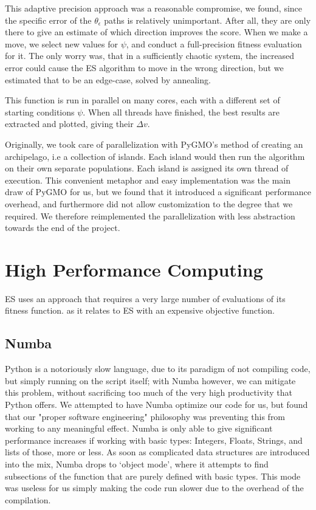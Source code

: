 This adaptive precision approach was a reasonable compromise, we found, since the specific error of the \(\theta_\epsilon\) paths is relatively unimportant. After all, they are only there to give an estimate of which direction improves the score. When we make a move, we select new values for \(\psi\), and conduct a full-precision fitness evaluation for it. The only worry was, that in a sufficiently chaotic system, the increased error could cause the ES algorithm to move in the wrong direction, but we estimated that to be an edge-case, solved by annealing.

This function is run in parallel on many cores, each with a different set of starting conditions \(\psi\). When all threads have finished, the best results are extracted and plotted, giving their \(\Delta v\).

Originally, we took care of parallelization with PyGMO's method of creating an archipelago, i.e a collection of islands. Each island would then run the algorithm on their own separate populations. Each island is assigned its own thread of execution. This convenient metaphor and easy implementation was the main draw of PyGMO for us, but we found that it introduced a significant performance overhead, and furthermore did not allow customization to the degree that we required. We therefore reimplemented the parallelization with less abstraction towards the end of the project.



\section{High Performance Computing}
ES uses an approach that requires a very large number of evaluations of its fitness function. 
as it relates to ES with an expensive objective function.



\subsection{Numba}

Python is a notoriously slow language, due to its paradigm of not compiling code, but simply running on the script itself; with Numba however, we can mitigate this problem, without sacrificing too much of the very high productivity that Python offers. We attempted to have Numba optimize our code for us, but found that our "proper software engineering" philosophy was preventing this from working to any meaningful effect. Numba is only able to give significant performance increases if working with basic types: Integers, Floats, Strings, and lists of those, more or less. As soon as complicated data structures are introduced into the mix, Numba drops to `object mode', where it attempts to find subsections of the function that are purely defined with basic types. This mode was useless for us simply making the code run slower due to the overhead of the compilation.

